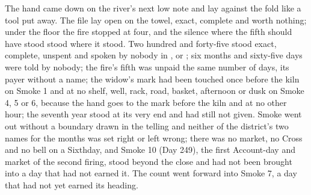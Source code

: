 The hand came down on the river's next low note and lay against the fold like a tool put away. The file lay open on the towel, exact, complete and worth nothing; under the floor the fire stopped at four, and the silence where the fifth should have stood stood where it stood. Two hundred and forty-five stood exact, complete, unspent and spoken by nobody in ,  or ; six months and sixty-five days were told by nobody; the fire's fifth was unpaid the same number of days, its payer without a name; the widow's mark had been touched once before the kiln on Smoke 1 and at no shelf, well, rack, road, basket, afternoon or dusk on Smoke 4, 5 or 6, because the hand goes to the mark before the kiln and at no other hour; the seventh year stood at its very end and had still not given. Smoke went out without a boundary drawn in the telling and neither of the district's two names for the months was set right or left wrong; there was no market, no Cross and no bell on a Sixthday, and Smoke 10 (Day 249), the first Account-day and market of the second firing, stood beyond the close and had not been brought into a day that had not earned it. The count went forward into Smoke 7, a day that had not yet earned its heading.
